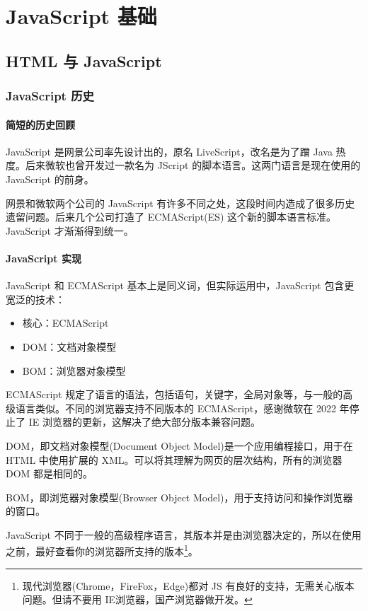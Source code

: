 \part{JavaScript 基础}
\chapter{HTML 与 JavaScript}
\section{JavaScript 历史}
\subsection{简短的历史回顾}

JavaScript 是网景公司率先设计出的，原名 LiveScript，改名是为了蹭 Java 热度。后来微软也曾开发过一款名为 JScript 的脚本语言。这两门语言是现在使用的 JavaScript 的前身。

网景和微软两个公司的 JavaScript 有许多不同之处，这段时间内造成了很多历史遗留问题。后来几个公司打造了 ECMAScript(ES) 这个新的脚本语言标准。JavaScript 才渐渐得到统一。

\subsection{JavaScript 实现}

JavaScript 和 ECMAScript 基本上是同义词，但实际运用中，JavaScript 包含更宽泛的技术：
\begin{itemize}
    \item 核心：ECMAScript
    \item DOM：文档对象模型
    \item BOM：浏览器对象模型
\end{itemize}

ECMAScript 规定了语言的语法，包括语句，关键字，全局对象等，与一般的高级语言类似。不同的浏览器支持不同版本的 ECMAScript，感谢微软在 2022 年停止了 IE 浏览器的更新，这解决了绝大部分版本兼容问题。

DOM，即文档对象模型(Document Object Model)是一个应用编程接口，用于在 HTML 中使用扩展的 XML。可以将其理解为网页的层次结构，所有的浏览器 DOM 都是相同的。

BOM，即浏览器对象模型(Browser Object Model)，用于支持访问和操作浏览器的窗口。

JavaScript 不同于一般的高级程序语言，其版本并是由浏览器决定的，所以在使用之前，最好查看你的浏览器所支持的版本\footnote{现代浏览器(Chrome，FireFox，Edge)都对 JS 有良好的支持，无需关心版本问题。但请不要用 IE浏览器，国产浏览器做开发。}。

\newpage